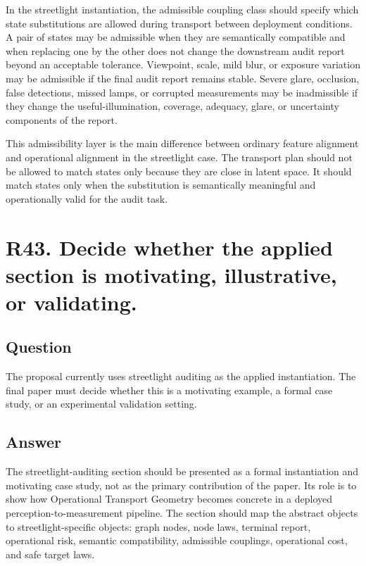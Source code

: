 \documentclass[11pt,a4paper]{article}
\begin{document}
In the streetlight instantiation, the admissible coupling class should specify which state substitutions are allowed during transport between deployment conditions. A pair of states may be admissible when they are semantically compatible and when replacing one by the other does not change the downstream audit report beyond an acceptable tolerance. Viewpoint, scale, mild blur, or exposure variation may be admissible if the final audit report remains stable. Severe glare, occlusion, false detections, missed lamps, or corrupted measurements may be inadmissible if they change the useful-illumination, coverage, adequacy, glare, or uncertainty components of the report.

This admissibility layer is the main difference between ordinary feature alignment and operational alignment in the streetlight case. The transport plan should not be allowed to match states only because they are close in latent space. It should match states only when the substitution is semantically meaningful and operationally valid for the audit task.

\section*{R43. Decide whether the applied section is motivating, illustrative, or validating.}

\subsection*{Question}

The proposal currently uses streetlight auditing as the applied instantiation. The final paper must decide whether this is a motivating example, a formal case study, or an experimental validation setting.

\subsection*{Answer}

The streetlight-auditing section should be presented as a formal instantiation and motivating case study, not as the primary contribution of the paper. Its role is to show how Operational Transport Geometry becomes concrete in a deployed perception-to-measurement pipeline. The section should map the abstract objects to streetlight-specific objects: graph nodes, node laws, terminal report, operational risk, semantic compatibility, admissible couplings, operational cost, and safe target laws.
\end{document}
